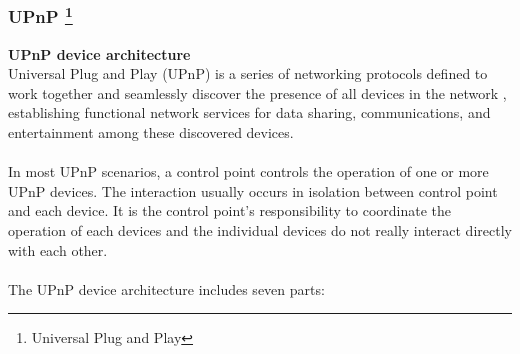 \subsubsection[UPnP]{UPnP \footnote{Universal Plug and Play}}
\textbf{UPnP device architecture}\\ 
Universal Plug and Play (UPnP) is a series of networking protocols defined to 
work together and seamlessly discover the presence of all devices in the network 
, establishing functional network services for data sharing, communications, and 
entertainment among these discovered devices.\\
\\ 
In most UPnP scenarios, a control point controls the operation of one or more 
UPnP devices. The interaction usually occurs in isolation between control point 
and each device. It is the control point's responsibility to coordinate the operation of 
each devices and the individual devices do not really interact directly with each other. \\
\\
The UPnP device architecture \cite{upnp} \label{upnp} \label{upnpdevice} 
includes seven parts:
